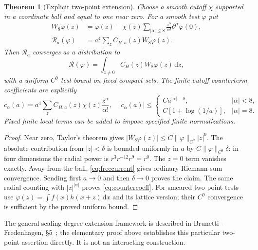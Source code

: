 \documentclass[11pt,letterpaper]{article}
\theoremstyle{plain}
\newtheorem{theorem}{Theorem}[section]
\theoremstyle{remark}\newtheorem{remark}[theorem]{Scope}
\newcommand{\dd}{\,\mathrm d}\newcommand{\OH}{\mathcal O_H}
\begin{document}
\begin{theorem}[Explicit two-point extension]
\label{thm:extension}
Choose a smooth cutoff $\chi$ supported in a coordinate ball and equal to one
near zero. For a smooth test $\varphi$ put
\begin{align}
W_8\varphi(z)&=\varphi(z)-\chi(z)
\sum_{|\alpha|\le8}\frac{z^\alpha}{\alpha!}\partial^\alpha\varphi(0),\label{eq:W8}\\
\mathcal R_a(\varphi)&=a^4\sum_z C_{H,a}(z)W_8\varphi(z).
\label{eq:Ra}
\end{align}
Then $\mathcal R_a$ converges as a distribution to
\begin{equation}
\mathcal R(\varphi)=\int_{z\ne0}C_H(z)W_8\varphi(z)\dd z,
\label{eq:Rlimit}
\end{equation}
with a uniform $C^9$ test bound on fixed compact sets. The finite-cutoff
counterterm coefficients are explicitly
\begin{equation}
c_\alpha(a)=a^4\sum_z C_{H,a}(z)\chi(z)\frac{z^\alpha}{\alpha!},
\quad |c_\alpha(a)|\le
\begin{cases}
C a^{|\alpha|-8},&|\alpha|<8,\\
C[1+\log(1/a)],&|\alpha|=8.
\end{cases}
\label{eq:countercoeff}
\end{equation}
Fixed finite local terms can be added to impose specified finite normalizations.
\end{theorem}
\begin{proof}
Near zero, Taylor's theorem gives
$|W_8\varphi(z)|\le C\|\varphi\|_{C^9}|z|^9$.
The absolute contribution from $|z|<\delta$ is bounded uniformly in $a$ by
$C\|\varphi\|_{C^9}\delta$: in four dimensions the radial power is
$r^3r^{-12}r^9=r^0$. The $z=0$ term vanishes exactly. Away from the ball,
\eqref{eq:freecurrent} gives ordinary Riemann-sum convergence. Sending first
$a\to0$ and then $\delta\to0$ proves the claim. The same radial counting with
$|z|^{|\alpha|}$ proves \eqref{eq:countercoeff}.
For smeared two-point tests use
$\varphi(z)=\int f(x)h(x+z)\dd x$ and its lattice version; their $C^9$
convergence is sufficient by the proved uniform bound.
\end{proof}

The general scaling-degree extension framework is described in
Brunetti--Fredenhagen, \S5~\cite{bf}; the elementary proof above establishes this
particular two-point assertion directly. It is not an interacting construction.
\end{document}
